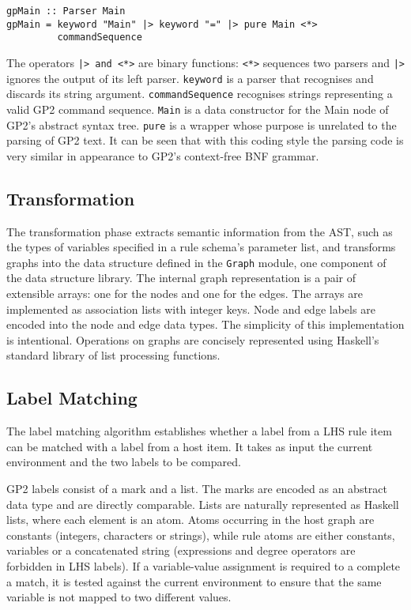 \begin{verbatim}
gpMain :: Parser Main
gpMain = keyword "Main" |> keyword "=" |> pure Main <*> 
         commandSequence
\end{verbatim}

The operators \texttt{|> and <*>} are binary functions: \texttt{<*>} sequences two parsers and \texttt{|>} ignores the output of its left parser. \texttt{keyword} is a parser that recognises and discards its string argument. \texttt{commandSequence} recognises strings representing a valid GP2 command sequence. \texttt{Main} is a data constructor for the Main node of GP2's abstract syntax tree. \texttt{pure} is a wrapper whose purpose is unrelated to the parsing of GP2 text. It can be seen that with this coding style the parsing code is very similar in appearance to GP2's context-free BNF grammar. 

\subsection{Transformation}

The transformation phase extracts semantic information from the AST, such as the types of variables specified in a rule schema's parameter list, and transforms graphs into the data structure defined in the \texttt{Graph} module, one component of the data structure library. The internal graph representation is a pair of extensible arrays: one for the nodes and one for the edges. The arrays are implemented as association lists with integer keys. Node and edge labels are encoded into the node and edge data types. The simplicity of this implementation is intentional. Operations on graphs are concisely represented using Haskell's standard library of list processing functions. 

\subsection{Label Matching}
The label matching algorithm establishes whether a label from a LHS rule item can be matched with a label from a host item. It takes as input the current environment and the two labels to be compared. 

GP2 labels consist of a mark and a list. The marks are encoded as an abstract data type and are directly comparable. Lists are naturally represented as Haskell lists, where each element is an atom. Atoms occurring in the host graph are constants (integers, characters or strings), while rule atoms are either constants, variables or a concatenated string (expressions and degree operators are forbidden in LHS labels). If a variable-value assignment is required to a complete a match, it is tested against the current environment to ensure that the same variable is not mapped to two different values. 

